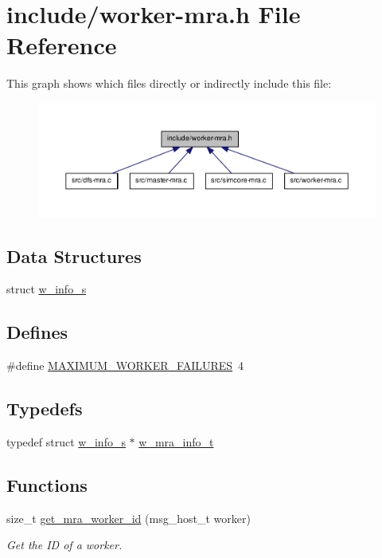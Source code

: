 \hypertarget{worker-mra_8h}{\section{include/worker-\/mra.h \-File \-Reference}
\label{worker-mra_8h}
}
\-This graph shows which files directly or indirectly include this file\-:\nopagebreak
\begin{figure}[H]
\begin{center}
\leavevmode
\includegraphics[width=350pt]{worker-mra_8h__dep__incl}
\end{center}
\end{figure}
\subsection*{\-Data \-Structures}
\begin{DoxyCompactItemize}
\item 
struct \hyperlink{structw__info__s}{w\-\_\-info\-\_\-s}
\end{DoxyCompactItemize}
\subsection*{\-Defines}
\begin{DoxyCompactItemize}
\item 
\#define \hyperlink{worker-mra_8h_a26c0275b68092d17962561ad4aae2d3a}{\-M\-A\-X\-I\-M\-U\-M\-\_\-\-W\-O\-R\-K\-E\-R\-\_\-\-F\-A\-I\-L\-U\-R\-E\-S}~4
\end{DoxyCompactItemize}
\subsection*{\-Typedefs}
\begin{DoxyCompactItemize}
\item 
typedef struct \hyperlink{structw__info__s}{w\-\_\-info\-\_\-s} $\ast$ \hyperlink{worker-mra_8h_a7ff71795c8d5448c353232dfe391387a}{w\-\_\-mra\-\_\-info\-\_\-t}
\end{DoxyCompactItemize}
\subsection*{\-Functions}
\begin{DoxyCompactItemize}
\item 
size\-\_\-t \hyperlink{worker-mra_8h_a5c30e22e7fb9c6f78fca445efe8277f6}{get\-\_\-mra\-\_\-worker\-\_\-id} (msg\-\_\-host\-\_\-t worker)
\begin{DoxyCompactList}\small\item\em \-Get the \-I\-D of a worker. \end{DoxyCompactList}\end{DoxyCompactItemize}



